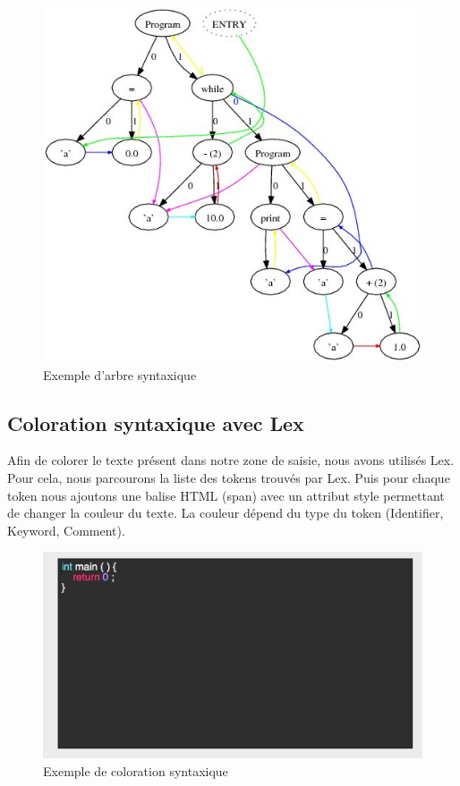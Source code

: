 \documentclass[a4paper,12pt]{article}
\begin{document}
			\begin{figure}[!h]
			
				\begin{center}
					\includegraphics[scale=0.6]{images/AST.jpg}
					\caption{Exemple d'arbre syntaxique}
				\end{center}
			
			\end{figure}
			
		
	\subsection{Coloration syntaxique avec Lex}

		Afin de colorer le texte présent dans notre zone de saisie, nous avons utilisés Lex. Pour cela, nous parcourons la liste des tokens trouvés par Lex. Puis pour chaque token nous ajoutons une balise HTML (span) avec un attribut style permettant de changer la couleur du texte. La couleur dépend du type du token (Identifier, Keyword, Comment). 

		\newpage
			
			\begin{figure}[!h]
			
				\begin{center}
					\includegraphics[scale=0.6]{images/coloration}
					\caption{Exemple de coloration syntaxique}
				\end{center}
			
			\end{figure}


			
					
			
\end{document}
